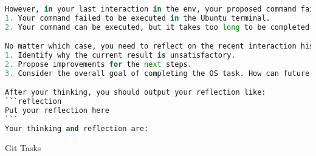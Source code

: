 \begin{lstlisting}[language=Python]
However, in your last interaction in the env, your proposed command failed. Usually, the failure may be due to:
1. Your command failed to be executed in the Ubuntu terminal.
2. Your command can be executed, but it takes too long to be completed and get the terminal response.

No matter which case, you need to reflect on the recent interaction history and consider the following points:
1. Identify why the current result is unsatisfactory.
2. Propose improvements for the next steps.
3. Consider the overall goal of completing the OS task. How can future actions better align with this objective?

After your thinking, you should output your reflection like:
```reflection
Put your reflection here
```
Your thinking and reflection are:
\end{lstlisting}





Git Tasks

